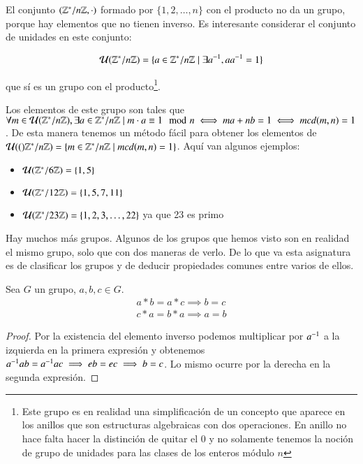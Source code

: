 \begin{ej}
	El conjunto $(\mathbb{Z}^*/n\mathbb{Z}, \cdot)$ formado por $\{1, 2, \dots, n\}$ con el producto no da un grupo, porque hay elementos que no tienen inverso. Es interesante considerar el conjunto de unidades en este conjunto:
	
	\begin{align*}
	\mathcal{U}(\mathbb{Z}^*/n\mathbb{Z}) = \{a \in \mathbb{Z}^*/n\mathbb{Z} \mid \exists a^{-1}, a a^{-1} = 1\}
	\end{align*}
	
	que sí es un grupo con el producto\footnote{Este grupo es en realidad una simplificación de un concepto que aparece en los anillos que son estructuras algebraicas con dos operaciones. En anillo no hace falta hacer la distinción de quitar el 0 y no solamente tenemos la noción de grupo de unidades para las clases de los enteros módulo $n$}.
	
	Los elementos de este grupo son tales que $\forall m \in \mathcal{U}(\mathbb{Z}^\ast / n\mathbb{Z}), \exists a \in \mathbb{Z}^\ast/n\mathbb{Z} \mid m\cdot a \equiv 1 \mod n \iff ma + nb = 1 \iff mcd(m,n) = 1$. De esta manera tenemos un método fácil para obtener los elementos de $\mathcal{U}(()\mathbb{Z}^\ast / n \mathbb{Z}) = \{m \in \mathbb{Z}^\ast/n\mathbb{Z} \mid mcd(m,n) = 1\}$. Aquí van algunos ejemplos:
	\begin{itemize}
		\item $\mathcal{U}(\mathbb{Z}^\ast/6\mathbb{Z}) = \{1, 5\}$
		\item $\mathcal{U}(\mathbb{Z}^\ast/12\mathbb{Z}) = \{1, 5, 7, 11\}$	
		\item $\mathcal{U}(\mathbb{Z}^\ast/23\mathbb{Z}) = \{1, 2, 3,\dots, 22\}$ ya que 23 es primo
	\end{itemize}
\end{ej}

Hay muchos más grupos. Algunos de los grupos que hemos visto son en realidad el mismo grupo, solo que con dos maneras de verlo. De lo que va esta asignatura es de clasificar los grupos y de deducir propiedades comunes entre varios de ellos.

\begin{thm}
	Sea $G$ un grupo, $a, b, c \in G$.
	\begin{align}
		a \ast b = a \ast c \implies b = c \\
		c \ast a = b \ast a \implies a = b
	\end{align}
\end{thm}

\begin{proof}
	Por la existencia del elemento inverso podemos multiplicar por $a^{-1}$ a la izquierda en la primera expresión y obtenemos $a^{-1} a b = a^{-1} a c \implies e b = e c \implies b = c$. Lo mismo ocurre por la derecha en la segunda expresión.
\end{proof}

